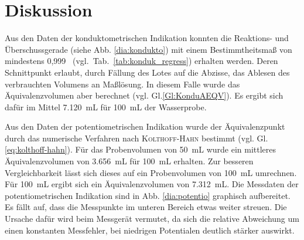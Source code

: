 \newpage
\section{Diskussion}
\label{sec:diskussion}

%
%

Aus den  Daten der konduktometrischen Indikation konnten die Reaktions- und Überschussgerade (siehe Abb. \ref{dia:kondukto}) mit einem Bestimmtheitsmaß von mindestens 0,999 \mbox{ (vgl. Tab. \ref{tab:konduk_regress})} erhalten werden. Deren Schnittpunkt erlaubt, durch Fällung des Lotes auf die Abzisse, das Ablesen des verbrauchten Volumens an Maßlösung. In diesem Falle wurde das Äquivalenzvolumen aber berechnet (vgl. Gl.\eqref{Gl:KonduAEQV}). Es ergibt sich dafür im Mittel \SI{7,120}{\milli\liter} für \SI{100}{\milli\liter} der Wasserprobe. 

Aus den Daten der potentiometrischen Indikation wurde der Äquivalenzpunkt durch das numerische Verfahren nach \textsc{Kolthoff-Hahn} bestimmt (vgl. Gl. \eqref{eq:kolthoff-hahn}). Für das Probenvolumen von \SI{50}{\milli\liter} wurde ein mittleres Äquivalenzvolumen von \SI{3,656}{\milli\liter} für \SI{100}{\milli\liter} erhalten. Zur besseren Vergleichbarkeit lässt sich dieses auf ein Probenvolumen von \SI{100}{\milli\liter} umrechnen. Für \SI{100}{\milli\liter} ergibt sich ein Äquivalenzvolumen von \SI{7,312}{\milli\liter}. Die Messdaten der potentiometrischen Indikation sind in Abb. \ref{dia:potentio} graphisch aufbereitet. Es fällt auf, dass die Messpunkte im unteren Bereich etwas weiter streuen. Die Ursache dafür wird beim Messgerät vermutet, da sich die relative Abweichung um einen konstanten Messfehler, bei niedrigen Potentialen deutlich stärker auswirkt. 


